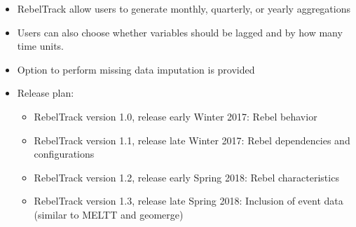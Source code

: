 \documentclass{beamer}
\begin{document}
\begin{frame}
\begin{itemize}
\item RebelTrack allow users to generate monthly, quarterly, or yearly aggregations
\item Users can also choose whether variables should be lagged and by how many time units.
\item Option to perform missing data imputation is provided
\item Release plan:
\begin{itemize}
\item RebelTrack version 1.0, release early Winter 2017: Rebel behavior
\item RebelTrack version 1.1, release late Winter 2017: Rebel dependencies and configurations
\item RebelTrack version 1.2, release early Spring 2018: Rebel characteristics 
\item RebelTrack version 1.3, release late Spring 2018: Inclusion of event data (similar to MELTT and geomerge)
\end{itemize}
\end{itemize}
\end{frame}






\end{document}
